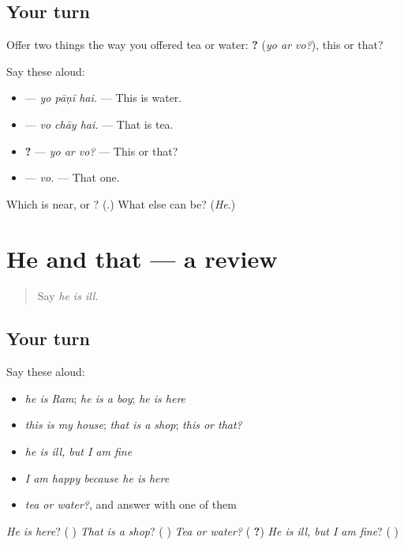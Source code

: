 \subsection*{Your turn}
Offer two things the way you offered tea or water: \textbf{  ?} (\emph{yo ar vo?}), this or that?

Say these aloud:

\begin{itemize}
\raggedright
  \item \textbf{  } — \emph{yo pāṇī hai.} — This is water.
  \item \textbf{  } — \emph{vo chāy hai.} — That is tea.
  \item \textbf{  ?} — \emph{yo ar vo?} — This or that?
  \item \textbf{} — \emph{vo.} — That one.
\end{itemize}

\begin{tcolorbox}[breakable,colback=teal!4,colframe=teal!35!black,title={Before you move on}]
Which is near, \textbf{} or \textbf{}? (\textbf{}.) What else can \textbf{} be? (\emph{He}.)
\end{tcolorbox}
\section[(dialogue)]{He and that — a review}

\label{lesson:MW-R152-he-and-that}



\begin{quote}
Say \emph{he is ill}.
\end{quote}

\subsection*{Your turn}
Say these aloud:

\begin{itemize}
\raggedright
  \item \emph{he is Ram}; \emph{he is a boy}; \emph{he is here}
  \item \emph{this is my house}; \emph{that is a shop}; \emph{this or that?}
  \item \emph{he is ill, but I am fine}
  \item \emph{I am happy because he is here}
  \item \emph{tea or water?}, and answer with one of them
\end{itemize}

\begin{tcolorbox}[breakable,colback=teal!4,colframe=teal!35!black,title={Before you move on}]
\emph{He is here}? (\textbf{  }) \emph{That is a shop}? (\textbf{  }) \emph{Tea or water?} (\textbf{  ?}) \emph{He is ill, but I am fine}? (\textbf{      })
\end{tcolorbox}
